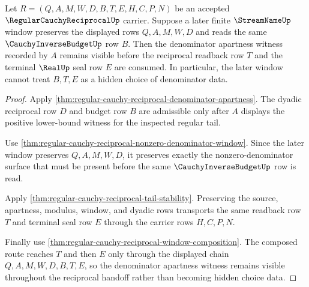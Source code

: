 \begin{theorem}
\label{thm:regularcauchyreciprocal-window-denominator-stability}
Let $R=(Q,A,M,W,D,B,T,E,H,C,P,N)$ be an accepted $\RegularCauchyReciprocalUp$ carrier. Suppose a later finite $\StreamNameUp$ window preserves the displayed rows $Q,A,M,W,D$ and reads the same $\CauchyInverseBudgetUp$ row $B$. Then the denominator apartness witness recorded by $A$ remains visible before the reciprocal readback row $T$ and the terminal $\RealUp$ seal row $E$ are consumed. In particular, the later window cannot treat $B,T,E$ as a hidden choice of denominator data.
\end{theorem}
\begin{proof}
Apply \autoref{thm:regular-cauchy-reciprocal-denominator-apartness}. The dyadic reciprocal row $D$ and budget row $B$ are admissible only after $A$ displays the positive lower-bound witness for the inspected regular tail.

Use \autoref{thm:regular-cauchy-reciprocal-nonzero-denominator-window}. Since the later window preserves $Q,A,M,W,D$, it preserves exactly the nonzero-denominator surface that must be present before the same $\CauchyInverseBudgetUp$ row is read.

Apply \autoref{thm:regular-cauchy-reciprocal-tail-stability}. Preserving the source, apartness, modulus, window, and dyadic rows transports the same readback row $T$ and terminal seal row $E$ through the carrier rows $H,C,P,N$.

Finally use \autoref{thm:regular-cauchy-reciprocal-window-composition}. The composed route reaches $T$ and then $E$ only through the displayed chain $Q,A,M,W,D,B,T,E$, so the denominator apartness witness remains visible throughout the reciprocal handoff rather than becoming hidden choice data.
\end{proof}


